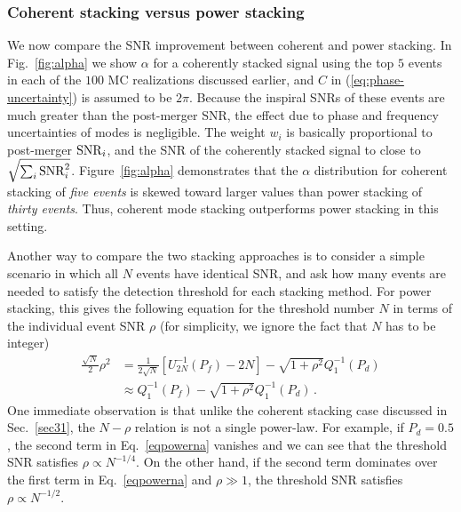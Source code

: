 \documentclass[prd,aps,floatfix,superscriptaddress,nofootinbib,twocolumn,10pt,English]{revtex4-1}
\begin{document}
\subsubsection{Coherent stacking versus power stacking}


We now compare the SNR improvement between coherent
and power stacking. In
Fig.~\ref{fig:alpha} we show $\alpha$ for a coherently stacked
signal using the top $5$ events in each of the $100$ MC realizations discussed
earlier, and $C$ in (\ref{eq:phase-uncertainty}) is assumed to be $2\pi$.  Because the inspiral SNRs of
these events are much greater than the post-merger SNR, the effect due
to phase and frequency uncertainties of modes is negligible. The
weight $w_i$ is basically proportional to post-merger ${\rm SNR}_i$,
and the SNR of the coherently stacked signal to close to $\sqrt{\sum_i
  {\rm SNR}^2_i}$. Figure~\ref{fig:alpha} demonstrates that the
$\alpha$ distribution for coherent stacking of \emph{five events}
is skewed toward larger values than power stacking of \emph{thirty
  events}. Thus, coherent mode stacking outperforms power stacking in
this setting. 

Another way to compare the two stacking approaches is to consider a
simple scenario in which all $N$ events have identical SNR, and ask
how many events are needed to satisfy the detection threshold for
each stacking method. For power stacking, this gives the following equation for the threshold
number $N$ in terms of the individual event SNR $\rho$ (for
simplicity, we ignore the fact that $N$ has to be integer)
\begin{align}\label{eqpowerna}
\frac{\sqrt{N}}{2} \rho^2 &= \frac{1}{2 \sqrt{N}} [U_{2N}^{-1} (P_f) -2N]-\sqrt{1+\rho^2} Q^{-1}_1(P_d) \nonumber \\
& \approx Q_1^{-1} (P_f) -\sqrt{1+\rho^2} Q^{-1}_1(P_d)\,.
\end{align}
 One immediate observation is
that unlike the coherent stacking case discussed in Sec.~\ref{sec31},
the $N - \rho$ relation is not a single power-law. For example, if $P_d=0.5$, 
the second term in Eq.~\eqref{eqpowerna} vanishes and we
can see that the threshold SNR satisfies $\rho \propto N^{-1/4}$. On
the other hand, if the second term dominates over the first term in
Eq.~\eqref{eqpowerna} and $\rho \gg 1$, the threshold SNR satisfies
$\rho \propto N^{-1/2}$.
\end{document}
